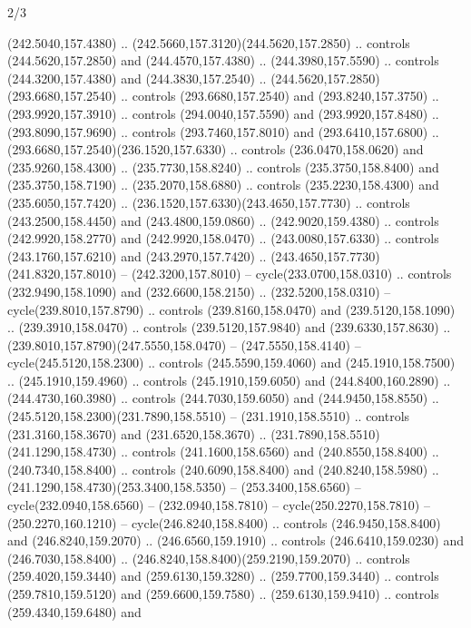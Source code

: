 \begin{flagdescription}{2/3}
\begin{scope}[xshift=0.5\flaglength,yshift=0.5\flagwidth,scale=\flagwidth/259.2]
\begin{scope}[y=0.8pt, x=0.8pt, yscale=-1,shift={(-243,-162)}]
      (242.5040,157.4380) .. (242.5660,157.3120)(244.5620,157.2850) .. controls
      (244.5620,157.2850) and (244.4570,157.4380) .. (244.3980,157.5590) .. controls
      (244.3200,157.4380) and (244.3830,157.2540) ..
      (244.5620,157.2850)(293.6680,157.2540) .. controls (293.6680,157.2540) and
      (293.8240,157.3750) .. (293.9920,157.3910) .. controls (294.0040,157.5590) and
      (293.9920,157.8480) .. (293.8090,157.9690) .. controls (293.7460,157.8010) and
      (293.6410,157.6800) .. (293.6680,157.2540)(236.1520,157.6330) .. controls
      (236.0470,158.0620) and (235.9260,158.4300) .. (235.7730,158.8240) .. controls
      (235.3750,158.8400) and (235.3750,158.7190) .. (235.2070,158.6880) .. controls
      (235.2230,158.4300) and (235.6050,157.7420) ..
      (236.1520,157.6330)(243.4650,157.7730) .. controls (243.2500,158.4450) and
      (243.4800,159.0860) .. (242.9020,159.4380) .. controls (242.9920,158.2770) and
      (242.9920,158.0470) .. (243.0080,157.6330) .. controls (243.1760,157.6210) and
      (243.2970,157.7420) .. (243.4650,157.7730)(241.8320,157.8010) --
      (242.3200,157.8010) -- cycle(233.0700,158.0310) .. controls
      (232.9490,158.1090) and (232.6600,158.2150) .. (232.5200,158.0310) --
      cycle(239.8010,157.8790) .. controls (239.8160,158.0470) and
      (239.5120,158.1090) .. (239.3910,158.0470) .. controls (239.5120,157.9840) and
      (239.6330,157.8630) .. (239.8010,157.8790)(247.5550,158.0470) --
      (247.5550,158.4140) -- cycle(245.5120,158.2300) .. controls
      (245.5590,159.4060) and (245.1910,158.7500) .. (245.1910,159.4960) .. controls
      (245.1910,159.6050) and (244.8400,160.2890) .. (244.4730,160.3980) .. controls
      (244.7030,159.6050) and (244.9450,158.8550) ..
      (245.5120,158.2300)(231.7890,158.5510) -- (231.1910,158.5510) .. controls
      (231.3160,158.3670) and (231.6520,158.3670) ..
      (231.7890,158.5510)(241.1290,158.4730) .. controls (241.1600,158.6560) and
      (240.8550,158.8400) .. (240.7340,158.8400) .. controls (240.6090,158.8400) and
      (240.8240,158.5980) .. (241.1290,158.4730)(253.3400,158.5350) --
      (253.3400,158.6560) -- cycle(232.0940,158.6560) -- (232.0940,158.7810) --
      cycle(250.2270,158.7810) -- (250.2270,160.1210) -- cycle(246.8240,158.8400) ..
      controls (246.9450,158.8400) and (246.8240,159.2070) .. (246.6560,159.1910) ..
      controls (246.6410,159.0230) and (246.7030,158.8400) ..
      (246.8240,158.8400)(259.2190,159.2070) .. controls (259.4020,159.3440) and
      (259.6130,159.3280) .. (259.7700,159.3440) .. controls (259.7810,159.5120) and
      (259.6600,159.7580) .. (259.6130,159.9410) .. controls (259.4340,159.6480) and

\end{scope}
\end{scope}
\end{flagdescription}
